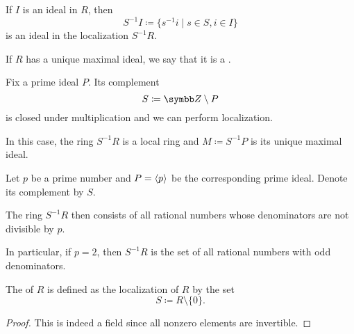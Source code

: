\begin{proposition}\label{thm:ring_localization_preserves_ideals}\cite[432]{Knapp2016BAlg}
  If \( I \) is an ideal in \( R \), then
  \begin{equation*}
    S^{-1} I \coloneqq \{ s^{-1} i \mid s \in S, i \in I \}
  \end{equation*}
  is an ideal in the localization \( S^{-1} R \).
\end{proposition}

\begin{definition}\label{def:local_ring}
  If \( R \) has a unique maximal ideal, we say that it is a .
\end{definition}

\begin{proposition}\label{thm:localization_of_prime_is_local}\cite[corollary 8.50]{Knapp2016BAlg}
  Fix a prime ideal \( P \). Its complement
  \begin{equation*}
    S \coloneqq \BZ \setminus P
  \end{equation*}
  is closed under multiplication and we can perform localization.

  In this case, the ring \( S^{-1} R \) is a local ring and \( M \coloneqq S^{-1} P \) is its unique maximal ideal.
\end{proposition}

\begin{example}\label{ex:ring_localization}\cite[430]{Knapp2016BAlg}
  Let \( p \) be a prime number and \( P = \left\langle p \right\rangle \) be the corresponding prime ideal. Denote its complement by \( S \).

  The ring \( S^{-1} R \) then consists of all rational numbers whose denominators are not divisible by \( p \).

  In particular, if \( p = 2 \), then \( S^{-1} R \) is the set of all rational numbers with odd denominators.
\end{example}

\begin{definition}\label{def:field_of_fractions}
  The  of \( R \) is defined as the localization of \( R \) by the set
  \begin{equation*}
    S \coloneqq R \setminus \{ 0 \}.
  \end{equation*}
\end{definition}
\begin{proof}
  This is indeed a field since all nonzero elements are invertible.
\end{proof}
